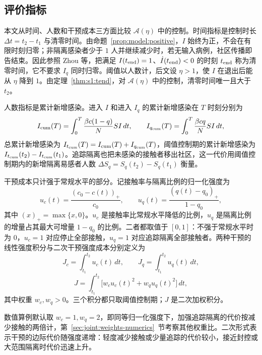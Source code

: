 \subsection{评价指标}
\label{sec:cost}
本文从时间、人数和干预成本三方面比较 $\mathcal A(\eta)$ 中的控制。时间指标是控制时长 $\Delta t=t_2-t_1$ 与清零时间。由命题~\ref{prop:model:positive}，$I$ 始终为正，不会在有限时刻归零；非隔离感染者少于 $1$ 人并继续减少时，若无输入病例，社区传播即告结束。因此参照 Zhou 等\cite{Zhou2024SPCI}，把满足 $I(t_{\rm end})=1$、$\dot I(t_{\rm end})<0$ 的时刻 $t_{\rm end}$ 称为清零时间，它不要求 $I_q$ 同时归零。阈值以人数计，后文设 $\eta>1$，使 $I$ 在退出后能从 $\eta$ 降到 $1$。由定理~\ref{thm:s1:tend}，对 $\mathcal A(\eta)$ 中的控制，清零时间唯一且大于 $t_2$。

人数指标是累计新增感染。进入 $I$ 和进入 $I_q$ 的累计新增感染在 $T$ 时刻分别为
\[
I_{\rm cum}(T)=\int_0^T\frac{\beta c(1-q)}{N}SI\,dt,\qquad
I_{q_{\rm cum}}(T)=\int_0^T\frac{\beta cq}{N}SI\,dt,
\]
总累计新增感染为 $I_{t_{\mathrm{cum}}}(T)=I_{\rm cum}(T)+I_{q_{\rm cum}}(T)$，阈值控制期的累计新增感染为 $I_{t_{\mathrm{cum}}}(t_2)-I_{t_{\mathrm{cum}}}(t_1)$。追踪隔离也把未感染的接触者移出社区，这一代价用阈值控制期内的新增隔离易感者人数 $\Delta S_q=S_q(t_2)-S_q(t_1)$ 衡量。

干预成本只计强于常规水平的部分。记接触率与隔离比例的归一化强度为
\[
u_c(t)=\frac{(c_0-c(t))_+}{c_0},\qquad
u_q(t)=\frac{(q(t)-q_0)_+}{1-q_0},
\]
其中 $(x)_+=\max\{x,0\}$。$u_c$ 是接触率比常规水平降低的比例，$u_q$ 是隔离比例的增量占其最大可增量 $1-q_0$ 的比例。二者都取值于 $[0,1]$：不强于常规水平时为 $0$，$u_c=1$ 对应停止全部接触，$u_q=1$ 对应追踪隔离全部接触者。两种干预的线性强度积分与二次干预强度成本分别定义为
\begin{equation}
J_c=\int_{t_1}^{t_2}u_c(t)\,dt,\qquad
J_q=\int_{t_1}^{t_2}u_q(t)\,dt,
\label{eq:cost:linear}
\end{equation}
\begin{equation}
J=\int_{t_1}^{t_2}\bigl[w_cu_c(t)^2+w_qu_q(t)^2\bigr]\,dt,
\label{eq:cost:J}
\end{equation}
其中权重 $w_c,w_q>0$。三个积分都只取阈值控制期；$J$ 是二次加权积分。

数值算例默认取 $w_c=1,w_q=2$，即同等归一化强度下，加强追踪隔离的代价按减少接触的两倍计，第~\ref{sec:joint:weights-numerics}~节考察其他权重比。二次形式表示干预的边际代价随强度递增：轻度减少接触或少量追踪的代价较小，接近封控或大范围隔离时代价迅速上升。
